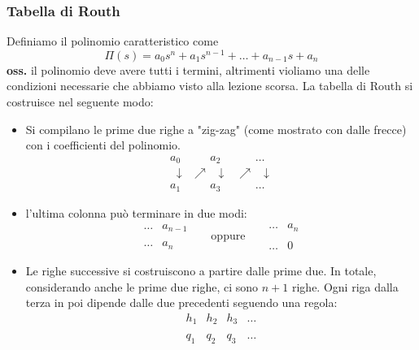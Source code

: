 \subsubsection{Tabella di Routh}
Definiamo il polinomio caratteristico come
\[
    \Pi(s) = a_0s^n + a_1 s^{n-1} + \dots + a_{n-1}s + a_n
\]
\textbf{oss.} il polinomio deve avere tutti i termini, altrimenti violiamo una delle condizioni necessarie che abbiamo visto alla lezione scorsa.\newline
\newline
La tabella di Routh si costruisce nel seguente modo:
\begin{itemize}
    \item Si compilano le prime due righe a "zig-zag" (come mostrato con dalle frecce) con i coefficienti del polinomio.
    \[
        \begin{matrix}
            a_0 & \;\;\;\;\;\; a_2 & \;\;\;\;\;\;\dots\\
            \;\;\downarrow & \nearrow \;\; \downarrow & \nearrow \;\; \downarrow\\
            a_1 & \;\;\;\;\;\; a_3 & \;\;\;\;\;\;\dots 
        \end{matrix}
    \]
    \item l'ultima colonna può terminare in due modi:
    \[
        \begin{matrix}
            \dots & a_{n-1}\\
            \;\\
            \dots & a_n
        \end{matrix}\;\;\;\;\;\; \text{oppure}\;\;\;\;\;\; \begin{matrix}
            \dots &a_n\\
            \;\\
            \dots & 0 
        \end{matrix}
    \]
    \item Le righe successive si costruiscono a partire dalle prime due.\newline
    In totale, considerando anche le prime due righe, ci sono $n+1$ righe.\newline
    Ogni riga dalla terza in poi dipende dalle due precedenti seguendo una regola:
    \[
        \begin{matrix}
            h_1 & h_2 & h_3 &\dots\\
            \;\\
            q_1 & q_2 & q_3 & \dots\\
            \;\\

\end{matrix}\]
\end{itemize}
